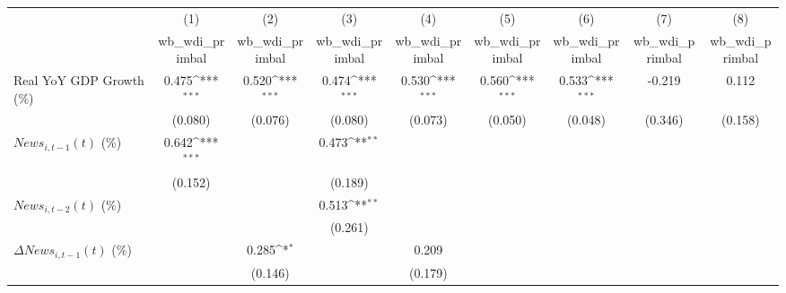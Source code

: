 {
\def\sym#1{\ifmmode^{#1}\else\(^{#1}\)\fi}
\begin{tabular}{l*{8}{c}}
\toprule
                    &\multicolumn{1}{c}{(1)}&\multicolumn{1}{c}{(2)}&\multicolumn{1}{c}{(3)}&\multicolumn{1}{c}{(4)}&\multicolumn{1}{c}{(5)}&\multicolumn{1}{c}{(6)}&\multicolumn{1}{c}{(7)}&\multicolumn{1}{c}{(8)}\\
                    &\multicolumn{1}{c}{wb_wdi_primbal}&\multicolumn{1}{c}{wb_wdi_primbal}&\multicolumn{1}{c}{wb_wdi_primbal}&\multicolumn{1}{c}{wb_wdi_primbal}&\multicolumn{1}{c}{wb_wdi_primbal}&\multicolumn{1}{c}{wb_wdi_primbal}&\multicolumn{1}{c}{wb_wdi_primbal}&\multicolumn{1}{c}{wb_wdi_primbal}\\
\midrule
Real YoY GDP Growth (\%)&       0.475\sym{***}&       0.520\sym{***}&       0.474\sym{***}&       0.530\sym{***}&       0.560\sym{***}&       0.533\sym{***}&      -0.219         &       0.112         \\
                    &     (0.080)         &     (0.076)         &     (0.080)         &     (0.073)         &     (0.050)         &     (0.048)         &     (0.346)         &     (0.158)         \\
\addlinespace
$ News_{i,t-1}(t)$ (\%)&       0.642\sym{***}&                     &       0.473\sym{**} &                     &                     &                     &                     &                     \\
                    &     (0.152)         &                     &     (0.189)         &                     &                     &                     &                     &                     \\
\addlinespace
$ News_{i,t-2}(t)$ (\%)&                     &                     &       0.513\sym{**} &                     &                     &                     &                     &                     \\
                    &                     &                     &     (0.261)         &                     &                     &                     &                     &                     \\
\addlinespace
$ \Delta News_{i,t-1}(t)$ (\%)&                     &       0.285\sym{*}  &                     &       0.209         &                     &                     &                     &                     \\
                    &                     &     (0.146)         &                     &     (0.179)         &                     &                     &                     &                     \\

\end{tabular}}
